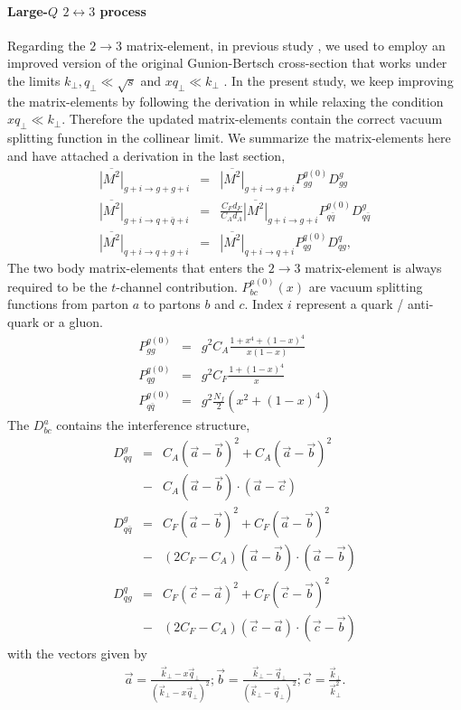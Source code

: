 \paragraph{Large-$Q$ $2\leftrightarrow 3$ process} 
Regarding the $2\rightarrow 3$ matrix-element, in previous study \cite{Ke:2018tsh}, we used to employ an improved version of the original Gunion-Bertsch cross-section that works under the limits $k_\perp, q_\perp \ll \sqrt{s}$ and $x q_\perp \ll k_\perp$ \cite{PhysRevD.25.746,Fochler:2013epa,Uphoff:2014hza}.
In the present study, we keep improving the matrix-elements by following the derivation in \cite{Fochler:2013epa} while relaxing the condition $x q_\perp \ll k_\perp$.
Therefore the updated matrix-elements contain the correct vacuum splitting function in the collinear limit.
We summarize the matrix-elements here and have attached a derivation in the last section,
\begin{eqnarray}
\overline{|M^2|}_{g+i\rightarrow g+g+i} &=& \overline{|M^2|}_{g+i\rightarrow g+i} P_{gg}^{g(0)}  D_{gg}^{g}\\
\overline{|M^2|}_{g+i\rightarrow q+\bar{q}+i} &=& \frac{C_F d_F}{C_A d_A}\overline{|M^2|}_{g+i\rightarrow g+i} P_{q\bar{q}}^{g(0)} D_{q\bar{q}}^{g}\\
\overline{|M^2|}_{q+i\rightarrow q+g+i} &=& \overline{|M^2|}_{q+i\rightarrow q+i} P_{qg}^{q(0)} D_{qg}^{q},
\end{eqnarray}
The two body matrix-elements that enters the $2\rightarrow 3$ matrix-element is always required to be the $t$-channel contribution.
$P_{bc}^{a(0)}(x)$ are vacuum splitting functions from parton $a$ to partons $b$ and $c$. Index $i$ represent a quark / anti-quark or a gluon.
\begin{eqnarray}
P_{gg}^{g(0)}  &=& g^2  C_A\frac{1+x^4+(1-x)^4}{x(1-x)}\\
P_{qg}^{q(0)} &=& g^2  C_F\frac{1+(1-x)^4}{x}\\
P_{q\bar{q}}^{g(0)} &=& g^2  \frac{N_f}{2}\left(x^2+(1-x)^4\right)
\end{eqnarray}
The $D_{bc}^{a}$ contains the interference structure,
\begin{eqnarray}
D_{qq}^{g} &=& 
C_A(\vec{a}-\vec{b})^2 + C_A(\vec{a}-\vec{b})^2 \\\nonumber
&-& C_A (\vec{a}-\vec{b})\cdot (\vec{a}-\vec{c})
\\
D_{q\bar{q}}^{g} &=& 
C_F(\vec{a}-\vec{b})^2 + C_F(\vec{a}-\vec{b})^2 \\\nonumber
&-& (2C_F-C_A) (\vec{a}-\vec{b})\cdot (\vec{a}-\vec{b})
\\
D_{qg}^{q} &=& 
C_F(\vec{c}-\vec{a})^2 + C_F(\vec{c}-\vec{b})^2 \\\nonumber
&-& (2C_F-C_A) (\vec{c}-\vec{a})\cdot (\vec{c}-\vec{b})
\end{eqnarray}
with the vectors given by
\begin{eqnarray}
\vec{a} = \frac{\vec{k}_\perp - x\vec{q}_\perp}{(\vec{k}_\perp - x\vec{q}_\perp)^2};
\vec{b} = \frac{\vec{k}_\perp - \vec{q}_\perp}{(\vec{k}_\perp - \vec{q}_\perp)^2};
\vec{c} =  \frac{\vec{k}_\perp}{\vec{k}_\perp^2}.
\end{eqnarray}

